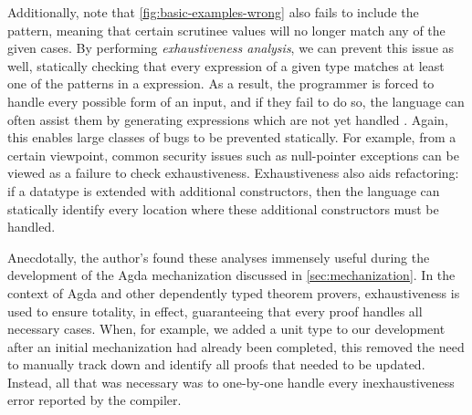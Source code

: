 Additionally, note that \autoref{fig:basic-examples-wrong} also fails to include the  pattern, meaning that certain scrutinee values will no longer match any of the given cases. By performing \emph{exhaustiveness analysis}, we can prevent this issue as well, statically checking that every expression of a given type matches at least one of the patterns in a  expression. As a result, the programmer is forced to handle every possible form of an input, and if they fail to do so, the language can often assist them by generating expressions which are not yet handled \cite{Harper2012}. Again, this enables large classes of bugs to be prevented statically. For example, from a certain viewpoint, common security issues such as null-pointer exceptions can be viewed as a failure to check exhaustiveness. Exhaustiveness also aids refactoring: if a datatype is extended with additional constructors, then the language can statically identify every location where these additional constructors must be handled. 

Anecdotally, the author's found these analyses immensely useful during the development of the Agda mechanization discussed in \autoref{sec:mechanization}. In the context of Agda and other dependently typed theorem provers, exhaustiveness is used to ensure totality, in effect, guaranteeing that every proof handles all necessary cases. When, for example, we added a unit type to our development after an initial mechanization had already been completed, this removed the need to manually track down and identify all proofs that needed to be updated. Instead, all that was necessary was to one-by-one handle every inexhaustiveness error reported by the compiler.